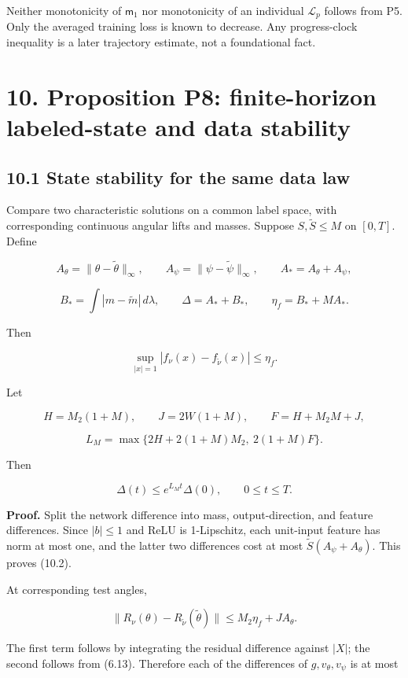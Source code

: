 \documentclass[
  10pt,
]{article}
\begin{document}
Neither monotonicity of \(\mathsf m_1\) nor monotonicity of an
individual \(\mathcal L_p\) follows from P5. Only the averaged training
loss is known to decrease. Any progress-clock inequality is a later
trajectory estimate, not a foundational fact.

\section{10. Proposition P8: finite-horizon labeled-state and data
stability}\label{proposition-p8-finite-horizon-labeled-state-and-data-stability}

\subsection{10.1 State stability for the same data
law}\label{state-stability-for-the-same-data-law}

Compare two characteristic solutions on a common label space, with
corresponding continuous angular lifts and masses. Suppose
\(S,\widetilde S\le M\) on \([0,T]\). Define

\[
 A_\theta=\|\theta-\widetilde\theta\|_\infty,\qquad
 A_\psi=\|\psi-\widetilde\psi\|_\infty,\qquad
 A_*=A_\theta+A_\psi,
\]

\[
 B_*=\int|m-\widetilde m|\,d\lambda,\qquad
 \Delta=A_*+B_*,\qquad \eta_f=B_*+MA_*.
 \tag{10.1}
\]

Then

\[
 \sup_{|x|=1}|f_\nu(x)-f_{\widetilde\nu}(x)|\le\eta_f.
 \tag{10.2}
\]

Let

\[
 H=M_2(1+M),\qquad J=2W(1+M),\qquad
 F=H+M_2M+J,
\]

\[
 L_M=\max\{2H+2(1+M)M_2,\ 2(1+M)F\}.
 \tag{10.3}
\]

Then

\[
 \Delta(t)\le e^{L_Mt}\Delta(0),\qquad 0\le t\le T.
 \tag{10.4}
\]

\textbf{Proof.} Split the network difference into mass,
output-direction, and feature differences. Since \(|b|\le1\) and ReLU is
1-Lipschitz, each unit-input feature has norm at most one, and the
latter two differences cost at most \(\widetilde S(A_\psi+A_\theta)\).
This proves (10.2).

At corresponding test angles,

\[
 \|R_\nu(\theta)-R_{\widetilde\nu}(\widetilde\theta)\|
 \le M_2\eta_f+J A_\theta.
 \tag{10.5}
\]

The first term follows by integrating the residual difference against
\(|X|\); the second follows from (6.13). Therefore each of the
differences of \(g,v_\theta,v_\psi\) is at most
\end{document}
